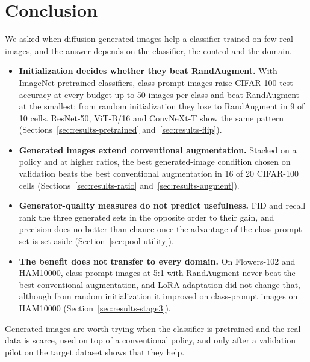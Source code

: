 \section{Conclusion}
\label{sec:conclusion}

We asked when diffusion-generated images help a classifier trained on few real images, and the answer depends on
the classifier, the control and the domain.
\begin{itemize}
	\item \textbf{Initialization decides whether they beat RandAugment.} With ImageNet-pretrained
	classifiers, class-prompt images raise CIFAR-100 test accuracy at every budget up to 50 images per class and
	beat RandAugment at the smallest; from random initialization they lose to RandAugment in 9 of 10 cells. ResNet-50,
	ViT-B/16 and ConvNeXt-T show the same pattern (Sections~\ref{sec:results-pretrained} and~\ref{sec:results-flip}).
	\item \textbf{Generated images extend conventional augmentation.} Stacked on a policy and at
	higher ratios, the best generated-image condition chosen on validation beats the best conventional augmentation in
	16 of 20 CIFAR-100 cells (Sections~\ref{sec:results-ratio} and~\ref{sec:results-augment}).
	\item \textbf{Generator-quality measures do not predict usefulness.} FID and recall rank the three generated sets
	in the opposite order to their gain, and precision does no better than chance once the advantage of the
	class-prompt set is set aside (Section~\ref{sec:pool-utility}).
	\item \textbf{The benefit does not transfer to every domain.} On Flowers-102 and HAM10000, class-prompt images at
	5:1 with RandAugment never beat the best conventional augmentation, and LoRA adaptation did not change that, although
	from random initialization it improved on class-prompt images on HAM10000
	(Section~\ref{sec:results-stage3}).
\end{itemize}
Generated images are worth trying when the classifier is pretrained and the real data is scarce, used on top of a
conventional policy, and only after a validation pilot on the target dataset shows that they help.
